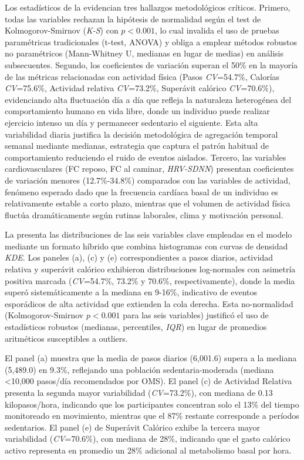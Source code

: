 Los estadísticos de la  evidencian tres hallazgos metodológicos críticos. Primero, todas las variables rechazan la hipótesis de normalidad según el test de Kolmogorov-Smirnov (\textit{K-S}) con $p<0.001$, lo cual invalida el uso de pruebas paramétricas tradicionales (t-test, ANOVA) y obliga a emplear métodos robustos no paramétricos (Mann-Whitney U, medianas en lugar de medias) en análisis subsecuentes. Segundo, los coeficientes de variación superan el 50\% en la mayoría de las métricas relacionadas con actividad física (Pasos \textit{CV}=54.7\%, Calorías \textit{CV}=75.6\%, Actividad relativa \textit{CV}=73.2\%, Superávit calórico \textit{CV}=70.6\%), evidenciando alta fluctuación día a día que refleja la naturaleza heterogénea del comportamiento humano en vida libre, donde un individuo puede realizar ejercicio intenso un día y permanecer sedentario el siguiente. Esta alta variabilidad diaria justifica la decisión metodológica de agregación temporal semanal mediante medianas, estrategia que captura el patrón habitual de comportamiento reduciendo el ruido de eventos aislados. Tercero, las variables cardiovasculares (FC reposo, FC al caminar, \textit{HRV-SDNN}) presentan coeficientes de variación menores (12.7\%-34.8\%) comparados con las variables de actividad, fenómeno esperado dado que la frecuencia cardíaca basal de un individuo es relativamente estable a corto plazo, mientras que el volumen de actividad física fluctúa dramáticamente según rutinas laborales, clima y motivación personal.

La  presenta las distribuciones de las seis variables clave empleadas en el modelo mediante un formato híbrido que combina histogramas con curvas de densidad \textit{KDE}. Los paneles (a), (c) y (e) correspondientes a pasos diarios, actividad relativa y superávit calórico exhibieron distribuciones log-normales con asimetría positiva marcada (\textit{CV}=54.7\%, 73.2\% y 70.6\%, respectivamente), donde la media superó sistemáticamente a la mediana en 9-16\%, indicativo de eventos esporádicos de alta actividad que extienden la cola derecha. Esta no-normalidad (Kolmogorov-Smirnov $p<0.001$ para las seis variables) justificó el uso de estadísticos robustos (medianas, percentiles, \textit{IQR}) en lugar de promedios aritméticos susceptibles a outliers.

El panel (a) muestra que la media de pasos diarios (6,001.6) supera a la mediana (5,489.0) en 9.3\%, reflejando una población sedentaria-moderada (mediana <10,000 pasos/día recomendados por OMS). El panel (c) de Actividad Relativa presenta la segunda mayor variabilidad (\textit{CV}=73.2\%), con mediana de 0.13 kilopasos/hora, indicando que los participantes concentran solo el 13\% del tiempo monitoreado en movimiento, mientras que el 87\% restante corresponde a períodos sedentarios. El panel (e) de Superávit Calórico exhibe la tercera mayor variabilidad (\textit{CV}=70.6\%), con mediana de 28\%, indicando que el gasto calórico activo representa en promedio un 28\% adicional al metabolismo basal por hora.

